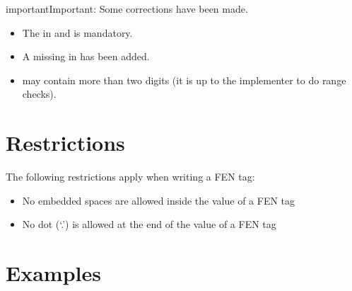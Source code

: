 \documentclass[letterpaper,10pt,english]{sphinxmanual}
\begin{document}
\begin{sphinxadmonition}{important}{Important:}
\sphinxAtStartPar
Some corrections have been made.
\begin{itemize}
\item {} 
\sphinxAtStartPar
The  in  and  is mandatory.

\item {} 
\sphinxAtStartPar
A missing  in  has been added.

\item {} 
\sphinxAtStartPar
{} may contain more than two digits (it is up to the implementer to do range checks).

\end{itemize}
\end{sphinxadmonition}


\section{Restrictions}
\label{\detokenize{fen:restrictions}}
\sphinxAtStartPar
The following restrictions apply when writing a FEN tag:
\begin{itemize}
\item {} 
\sphinxAtStartPar
No embedded spaces are allowed inside the value of a FEN tag

\item {} 
\sphinxAtStartPar
No dot (‘.’) is allowed at the end of the value of a FEN tag

\end{itemize}


\section{Examples}
\label{\detokenize{fen:examples}}
\begin{sphinxVerbatim}[commandchars=\\\{\}]
\PYG{p}{[} \PYG{p}{]}
\PYG{p}{[} \PYG{p}{]}
\PYG{p}{[} \PYG{p}{]}
\end{sphinxVerbatim}
\end{document}
